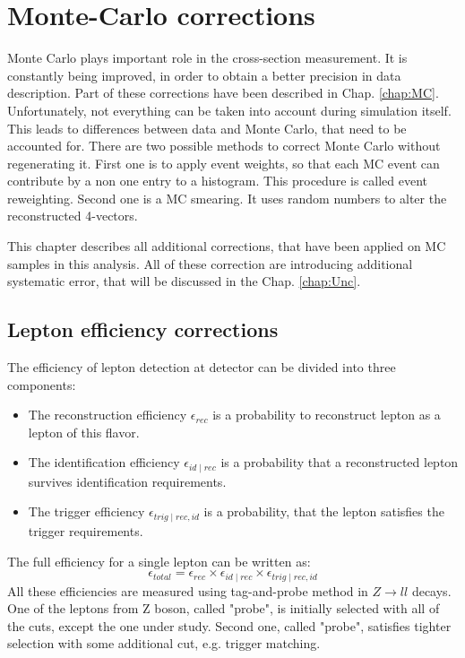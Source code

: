 \chapter{Monte-Carlo corrections}\label{chap:MCCor}
Monte Carlo plays important role in the cross-section measurement. It is constantly being improved, in order to obtain a better precision in data description. Part of these corrections have been described in Chap. \ref{chap:MC}. Unfortunately, not everything can be taken into account during simulation itself. This leads to differences between data and Monte Carlo, that need to be accounted for. There are two possible methods to correct Monte Carlo without regenerating it. First one is to apply event weights, so that each MC event can contribute by a non one entry to a histogram. This procedure is called event reweighting. Second one is a MC smearing. It uses random numbers to alter the reconstructed 4-vectors. 

This chapter describes all additional corrections, that have been applied on MC samples in this analysis. All of these correction are introducing additional systematic error, that will be discussed in the Chap. \ref{chap:Unc}.

\section{Lepton efficiency corrections}\label{sec:Eff}

The efficiency of lepton detection at \atlas detector can be divided into three components:
\begin{itemize}
\item The reconstruction efficiency $\epsilon_{rec}$ is a probability to reconstruct lepton as a lepton of this flavor.
\item The identification efficiency $\epsilon_{id \mid rec}$ is a probability that a reconstructed lepton survives  identification requirements. 
\item The trigger efficiency $\epsilon_{trig \mid rec,id}$ is a probability, that the lepton satisfies the trigger requirements. 
\end{itemize}
The full efficiency for a single lepton can be written as:
\begin{equation}
\epsilon_{total}=\epsilon_{rec} \times \epsilon_{id \mid rec} \times \epsilon_{trig \mid rec,id}
\end{equation}
All these efficiencies are measured using tag-and-probe method in $Z\to ll$ decays.  One of the leptons from Z boson, called "probe", is initially selected with all of the cuts, except the one under study. Second one, called "probe", satisfies tighter selection with some additional cut, e.g. trigger matching.

